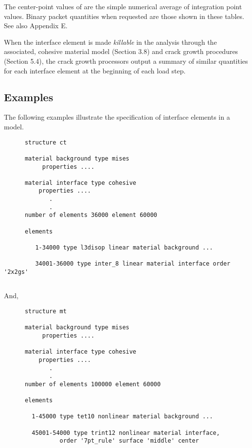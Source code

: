 \documentclass[11pt]{report}
\numberwithin{equation}{section}
\newcommand{\ti}{\emph}
\begin{document}
The center-point values of  are the simple numerical average of 
integration point values. Binary packet quantities when requested 
are those shown in these tables. See also Appendix E.

When the interface element is made \ti{killable} in the analysis 
through the associated, cohesive material model (Section 3.8) and crack growth 
procedures (Section 5.4), the crack growth processors output a summary 
of similar quantities for each interface element at the beginning 
of each load step.
%
\subsection{Examples}
The following examples illustrate the specification 
of interface elements in a model.
\small \begin{verbatim}
      structure ct
   
      material background type mises  
           properties ....
   
      material interface type cohesive 
          properties ....
             .
             .   
      number of elements 36000 element 60000 
 
      elements 
      
         1-34000 type l3disop linear material background ...
  
         34001-36000 type inter_8 linear material interface order '2x2gs'
                                     
\end{verbatim}\normalsize
And,
\small \begin{verbatim}
      structure mt
   
      material background type mises  
           properties ....
   
      material interface type cohesive 
          properties ....
             .
             .   
      number of elements 100000 element 60000 
 
      elements 
      
        1-45000 type tet10 nonlinear material background ...
        
        45001-54000 type trint12 nonlinear material interface,
                order '7pt_rule' surface 'middle' center

\end{verbatim}\normalsize
%
\end{document}
